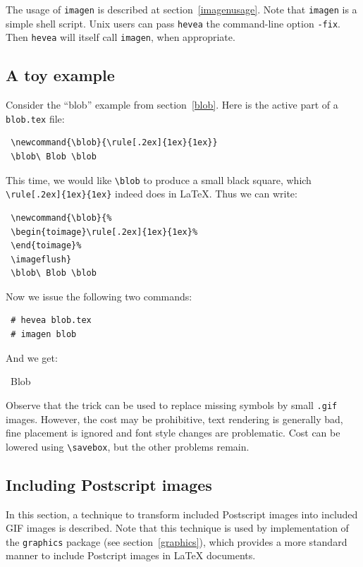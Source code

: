 The  usage of \verb+imagen+  is described at
section~\ref{imagenusage}. Note that \texttt{imagen} is a simple shell
script. Unix users can pass \texttt{hevea} the command-line option
\texttt{-fix}. Then \texttt{hevea} will
itself call \texttt{imagen}, when appropriate.





\subsection{A toy example}
Consider the ``blob'' example from section~\ref{blob}.
Here is the active part of a \texttt{blob.tex} file:
\begin{verbatim}
 \newcommand{\blob}{\rule[.2ex]{1ex}{1ex}}
 \blob\ Blob \blob
\end{verbatim}
This time, we would like \verb+\blob+ to produce a small black square, which
\verb+\rule[.2ex]{1ex}{1ex}+ indeed does in \LaTeX{}.
Thus we can write:
\begin{verbatim}
 \newcommand{\blob}{%
 \begin{toimage}\rule[.2ex]{1ex}{1ex}%
 \end{toimage}%
 \imageflush}
 \blob\ Blob \blob
\end{verbatim}
Now we issue the following two commands:
\begin{verbatim}
 # hevea blob.tex
 # imagen blob
\end{verbatim}
And we get:
\begin{htmlout}
\begin{htmlonly}
\newcommand{\blob}{%
\begin{toimage}\rule[.2ex]{1ex}{1ex}%
\end{toimage}%
\imageflush}\newsavebox{\blobbox}\sbox{\blobbox}{\blob}
\usebox{\blobbox}\ Blob \usebox{\blobbox}
\end{htmlonly}
\begin{latexonly}\vspace*{.5ex}
\end{latexonly}%
\end{htmlout}

Observe that the trick can be used to replace missing symbols by small
\texttt{.gif} images. However, the cost may be prohibitive, text rendering
is generally bad, fine placement is ignored and font style changes are
problematic.
Cost can be lowered using \verb+\savebox+, but the other problems remain.


\subsection{Including Postscript images}\label{substimage}
In this section, a technique to transform included Postscript images
into included GIF images is described.
Note that this technique is used by \hevea{} implementation of the
\texttt{graphics} package (see section~\ref{graphics}),
which provides a more standard manner to include Postcript images in
\LaTeX{} documents.

